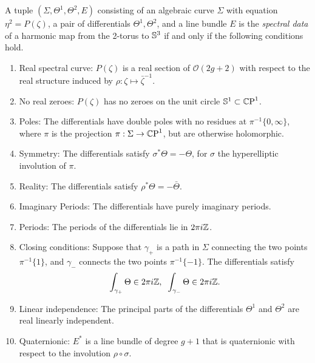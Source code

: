 \documentclass{article}
\begin{document}
\begin{thm}[Hitchin]\label{thm:Hitchin}
A tuple $(\Sigma,\Theta^1,\Theta^2,E)$ consisting of an algebraic curve $\Sigma$ with equation $\eta^2 = P(\zeta)$, a pair of differentials $\Theta^1, \Theta^2$, and a line bundle $E$ is the \emph{spectral data} of a harmonic map from the 2-torus to $\S^3$ if and only if the following conditions hold.
\begin{enumerate}[label=(P.\arabic*)]
\item\label{P:real curve} Real spectral curve: $P(\zeta)$ is a real section of $\mathcal{O}(2g+2)$ with respect to the real structure induced by $\rho : \zeta \mapsto \bar{\zeta}^{-1}$.
\item\label{P:no real zeroes} No real zeroes: $P(\zeta)$ has no zeroes on the unit circle $\S^1\subset\CP^1$.
\item\label{P:poles} Poles: The differentials have double poles with no residues at $\pi^{-1}\{0,\infty\}$, where $\pi$ is the projection $\pi: \Sigma \to \CP^1$, but are otherwise holomorphic.
\item\label{P:symmetry} Symmetry: The differentials satisfy $\sigma^* \Theta = - \Theta$, for $\sigma$ the hyperelliptic involution of $\pi$.
\item\label{P:reality} Reality: The differentials satisfy $\rho^* \Theta = - \bar{\Theta}$.
\item\label{P:imaginary periods} Imaginary Periods: The differentials have purely imaginary periods.
\item\label{P:periods} Periods: The periods of the differentials lie in $2\pi\iu\Z$.
\item\label{P:closing} Closing conditions: Suppose that $\gamma_+$ is a path in $\Sigma$ connecting the two points $\pi^{-1}\{1\}$, and $\gamma_-$ connects the two points $\pi^{-1}\{-1\}$. The differentials satisfy
\[
\int_{\gamma_+}\Theta \in 2\pi\iu\Z,\;\; 
\int_{\gamma_-}\Theta \in 2\pi\iu\Z.
\]
\item\label{P:linear independence} Linear independence: The principal parts of the differentials $\Theta^1$ and $\Theta^2$ are real linearly independent.
\item\label{P:quaternionic} Quaternionic: $E^*$ is a line bundle of degree $g+1$ that is quaternionic with respect to the involution $\rho \circ \sigma$.
\end{enumerate}
\end{thm}
\end{document}
